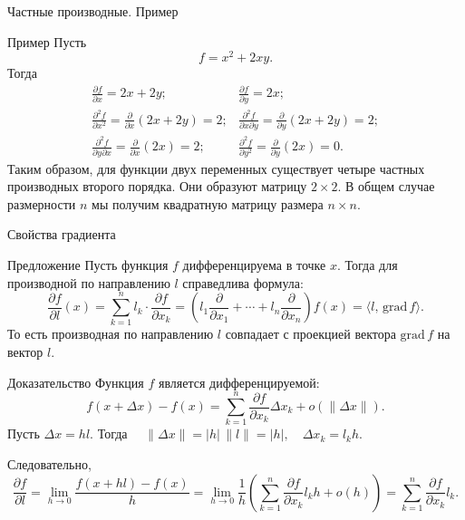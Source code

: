 \documentclass[8pt]{beamer}
\newcommand{\grad}{\mathrm{grad\,}}
\newcommand{\pp}[2]{\frac{\partial #1}{\partial #2}}
\begin{document}
\begin{frame}{Частные производные. Пример}
\begin{block}{Пример}
Пусть
$$f = x^2+2xy.$$
Тогда
$$\begin{array}{ll}
\frac{\partial f}{\partial x} = 2x+2y;&
\frac{\partial f}{\partial y} = 2x;\\[0.8em]
\frac{\partial^2 f}{\partial x^2} = \frac{\partial}{\partial x}\left( 2x+2y\right)  =2;&
\frac{\partial^2 f}{\partial x \partial y} = \frac{\partial}{\partial y}\left( 2x+2y\right)  =2;\\[0.8em]
\frac{\partial^2 f}{\partial y \partial x} = \frac{\partial}{\partial x}\left( 2x \right)  =2;&
\frac{\partial^2 f}{\partial y^2} = \frac{\partial}{\partial y}\left(2x\right)  = 0.
\end{array}$$
Таким образом, для функции двух переменных существует четыре частных производных второго порядка. Они образуют матрицу $2\times2$. В общем случае размерности $n$ мы получим квадратную матрицу размера $n\times n$.
\end{block}
\end{frame}

\begin{frame}{Свойства градиента}
\begin{block}{Предложение}
Пусть функция $f$ дифференцируема в точке $x$. Тогда для производной по направлению $l$ справедлива формула:
$$\frac{\partial f}{\partial l}(x) = \sum_{k=1}^n l_k\cdot \frac{\partial f}{\partial x_k} = \left( l_1 \frac{\partial}{\partial x_1} + \cdots + l_n \frac{\partial}{\partial x_n} \right) f(x) = \langle l,\, \grad f \rangle.$$
То есть производная по направлению $l$ совпадает с проекцией вектора $\grad f$ на вектор $l$.
\end{block}
\begin{block}{Доказательство}
Функция $f$ является дифференцируемой:
$$f(x+\Delta x) - f(x) =  \sum_{k=1}^n \frac{\partial f}{\partial x_k} \Delta x_k + o\left(\|\Delta x\|\right).
$$
Пусть $\Delta x = h l$. Тогда $\displaystyle\quad \|\Delta x\| = |h|\,\|l\| = |h|,\quad \Delta x_k  = l_k h.$

Следовательно,
$$\pp{f}{l} = \lim_{h\to0}\frac{f(x+h l) - f(x)}{h} = \lim_{h\to 0}\frac{1}{h}\left( \sum_{k=1}^n \frac{\partial f}{\partial x_k} l_k h + o(h)\right) = \sum_{k=1}^n \frac{\partial f}{\partial x_k} l_k.$$

\end{block}
\end{frame}
\end{document}
